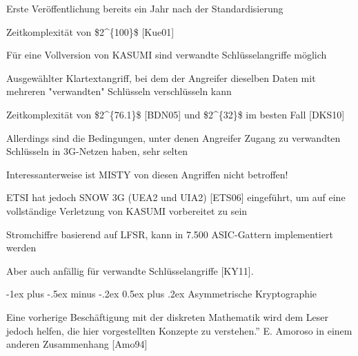 \documentclass[a4paper]{article}
\makeatletter
\renewcommand{\section}{\@startsection{section}{1}{0mm}%
 {-1ex plus -.5ex minus -.2ex}%
 {0.5ex plus .2ex}%
 {\normalfont\large\bfseries}}
\makeatother
\begin{document}
\begin{multicols}{3}
\begin{itemize*}
            \begin{itemize*}
                  \item Erste Veröffentlichung bereits ein Jahr nach der Standardisierung
                  \item Zeitkomplexität von \$2\^{}\{100\}\$ {[}Kue01{]}
            \end{itemize*}
            \item
            Für eine Vollversion von KASUMI sind verwandte Schlüsselangriffe
            möglich

            \begin{itemize*}
                  \item Ausgewählter Klartextangriff, bei dem der Angreifer dieselben Daten mit mehreren "verwandten" Schlüsseln verschlüsseln kann
                  \item Zeitkomplexität von \$2\^{}\{76.1\}\$ {[}BDN05{]} und \$2\^{}\{32\}\$ im besten Fall {[}DKS10{]}
                  \item Allerdings sind die Bedingungen, unter denen Angreifer Zugang zu verwandten Schlüsseln in 3G-Netzen haben, sehr selten
                  \item Interessanterweise ist MISTY von diesen Angriffen nicht betroffen!
            \end{itemize*}
            \item
            ETSI hat jedoch SNOW 3G (UEA2 und UIA2) {[}ETS06{]} eingeführt, um auf
            eine vollständige Verletzung von KASUMI vorbereitet zu sein

            \begin{itemize*}
                  \item Stromchiffre basierend auf LFSR, kann in 7.500 ASIC-Gattern implementiert werden
                  \item Aber auch anfällig für verwandte Schlüsselangriffe {[}KY11{]}.
            \end{itemize*}
      \end{itemize*}


      \section{Asymmetrische
        Kryptographie}

      Eine vorherige Beschäftigung mit der diskreten Mathematik wird dem Leser
      jedoch helfen, die hier vorgestellten Konzepte zu verstehen.'' E.
      Amoroso in einem anderen Zusammenhang {[}Amo94{]}


\end{multicols}
\end{document}
